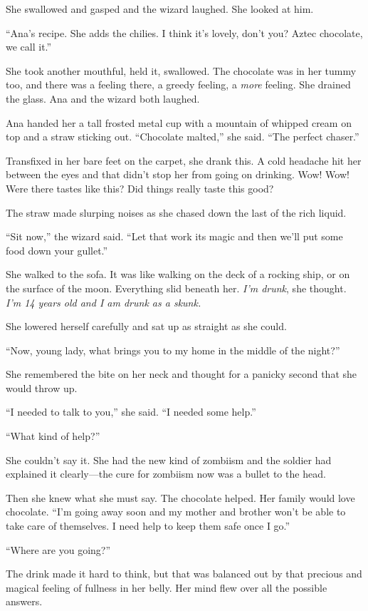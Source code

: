 She swallowed and gasped and the wizard laughed. She looked at
him.

“Ana’s recipe. She adds the chilies. I think it’s lovely, don’t
you? Aztec chocolate, we call it.”

She took another mouthful, held it, swallowed. The chocolate was in
her tummy too, and there was a feeling there, a greedy feeling, a
\emph{more} feeling. She drained the glass. Ana and the wizard both
laughed.

Ana handed her a tall frosted metal cup with a mountain of whipped
cream on top and a straw sticking out. “Chocolate malted,” she
said. “The perfect chaser.”

Transfixed in her bare feet on the carpet, she drank this. A cold
headache hit her between the eyes and that didn’t stop her from
going on drinking. Wow! Wow! Were there tastes like this? Did
things really taste this good?

The straw made slurping noises as she chased down the last of the
rich liquid.

“Sit now,” the wizard said. “Let that work its magic and then we’ll
put some food down your gullet.”

She walked to the sofa. It was like walking on the deck of a
rocking ship, or on the surface of the moon. Everything slid
beneath her. \emph{I’m drunk}, she thought.
\emph{I’m 14 years old and I am drunk as a skunk.}

She lowered herself carefully and sat up as straight as she could.

“Now, young lady, what brings you to my home in the middle of the
night?”

She remembered the bite on her neck and thought for a panicky
second that she would throw up.

“I needed to talk to you,” she said. “I needed some help.”

“What kind of help?”

She couldn’t say it. She had the new kind of zombiism and the
soldier had explained it clearly—the cure for zombiism now was a
bullet to the head.

Then she knew what she must say. The chocolate helped. Her family
would love chocolate. “I’m going away soon and my mother and
brother won’t be able to take care of themselves. I need help to
keep them safe once I go.”

“Where are you going?”

The drink made it hard to think, but that was balanced out by that
precious and magical feeling of fullness in her belly. Her mind
flew over all the possible answers.

